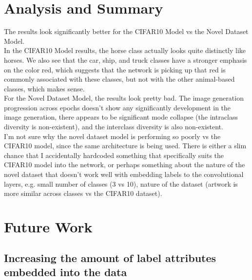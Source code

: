 \documentclass[11pt]{article}
\begin{document}
    \begin{center}
    \end{center}

    
    \section{Analysis and Summary}\label{analysis-and-summary}

The results look significantly better for the CIFAR10 Model vs the Novel
Dataset Model.\\

In the CIFAR10 Model results, the horse class actually looks quite
distinctly like horses. We also see that the car, ship, and truck
classes have a stronger emphasis on the color red, which suggests that
the network is picking up that red is commonly associated with these
classes, but not with the other animal-based classes, which makes sense.\\

For the Novel Dataset Model, the results look pretty bad. The image
generation progression across epochs doesn't show any significantly
development in the image generation, there appears to be significant
mode collapse (the intraclass diversity is non-existent), and the
interclass diversity is also non-existent.\\

I'm not sure why the novel dataset model is performing so poorly vs the
CIFAR10 model, since the same architecture is being used. There is
either a slim chance that I accidentally hardcoded something that
specifically suits the CIFAR10 model into the network, or perhaps
something about the nature of the novel dataset that doesn't work well
with embedding labels to the convolutional layers, e.g. small number of
classes (3 vs 10), nature of the dataset (artwork is more similar across
classes vs the CIFAR10 dataset).

\section{Future Work}\label{future-work}

\subsection{Increasing the amount of label attributes embedded into
the
data}\label{increasing-the-amount-of-label-attributes-embedded-into-the-data}
\end{document}
